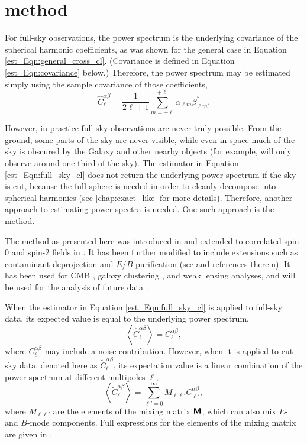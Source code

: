 \section{\texorpdfstring{\Pcl{}}{Pseudo-Cl} method}
\label{est_Sec:pcl}

For full-sky observations, the power spectrum is the underlying covariance of the spherical harmonic coefficients, as was shown for the general case in Equation \eqref{est_Eqn:general_cross_cl}. (Covariance is defined in Equation \eqref{est_Eqn:covariance} below.) Therefore, the power spectrum may be estimated simply using the sample covariance of those coefficients,
\begin{equation}
\widehat{C}_\ell^{\alpha \beta} = \frac{1}{2 \ell + 1}
\sum_{m = - \ell}^{+ \ell} \alpha_{\ell m} \beta_{\ell m}^*.
\label{est_Eqn:full_sky_cl}
\end{equation}

However, in practice full-sky observations are never truly possible. From the ground, some parts of the sky are never visible, while even in space much of the sky is obscured by the Galaxy and other nearby objects (for example, \Euclid{} will only observe around one third of the sky). The estimator in Equation \eqref{est_Eqn:full_sky_cl} does not return the underlying power spectrum if the sky is cut, because the full sphere is needed in order to cleanly decompose into spherical harmonics (see \autoref{chap:exact_like} for more details). Therefore, another approach to estimating power spectra is needed. One such approach is the \pcl{} method.

The \pcl{} method as presented here was introduced in \citet{Hivon2002} and extended to correlated spin-0 and spin-2 fields in \citet{Kogut2003, Brown2005}. It has been further modified to include extensions such as contaminant deprojection and $E$/$B$ purification (see \citealt{Alonso2019} and references therein). It has been used for CMB \citep{Kogut2003}, galaxy clustering \citep{Camacho2019}, and weak lensing \citep{Hikage2019} analyses, and will be used for the analysis of future \Euclid{} data \citep{Loureiro2021}.

When the estimator in Equation \eqref{est_Eqn:full_sky_cl} is applied to full-sky data, its expected value is equal to the underlying power spectrum,
\begin{equation}
\left\langle \widehat{C}_\ell^{\alpha \beta} \right\rangle
= C_\ell^{\alpha \beta},
\end{equation}
where $C_\ell^{\alpha \beta}$ may include a noise contribution. However, when it is applied to cut-sky data, denoted here as $\widetilde{C}_\ell^{\alpha \beta}$, its expectation value is a linear combination of the power spectrum at different multipoles $\ell$,
\begin{equation}
\left\langle \widetilde{C}_\ell^{\alpha \beta} \right\rangle
= \sum_{\ell' = 0}^\infty M_{\ell \ell'}
C^{\alpha \beta}_{\ell'},
\label{est_Eqn:mixing_forward}
\end{equation}
where $M_{\ell \ell'}$ are the elements of the mixing matrix $\bm{\mathsf{M}}$, which can also mix $E$- and $B$-mode components. Full expressions for the elements of the mixing matrix are given in \citet{Brown2005}.

